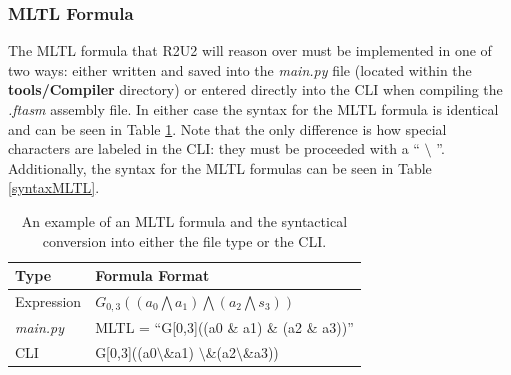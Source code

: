 \subsubsection{MLTL Formula}
\label{mltlFormula}
The MLTL formula that R2U2 will reason over must be implemented in one of two ways: either written and saved into the \textit{main.py} file (located within the \textbf{tools/Compiler} directory) or entered directly into the CLI when compiling the \textit{.ftasm} assembly file. In either case the syntax for the MLTL formula is identical and can be seen in Table \ref{mltlFormulaTable}. Note that the only difference is how special characters are labeled in the CLI: they must be proceeded with a `` $\setminus$ ''. Additionally, the syntax for the MLTL formulas can be seen in Table \ref{syntaxMLTL}.

\begin{table}[H]
	\caption{An example of an MLTL formula and the syntactical conversion into either the file type or the CLI.}
	\label{mltlFormulaTable}
	\begin{center}
	\begin{tabular}{l | l}
		\hline
		\hline
		\textbf{Type} & \textbf{Formula Format}\\
		\hline
		Expression & $G_{0,3}((a_0\bigwedge a_1)\bigwedge (a_2 \bigwedge s_3))$\\
		\textit{main.py} & MLTL = ``G[0,3]((a0 \& a1) \& (a2 \& a3))''\\
		CLI & G[0,3]((a0$\setminus$\&a1) $\setminus$\&(a2$\setminus$\&a3))\\
		\hline
		\hline
	\end{tabular}
	\end{center}
\end{table}

%


